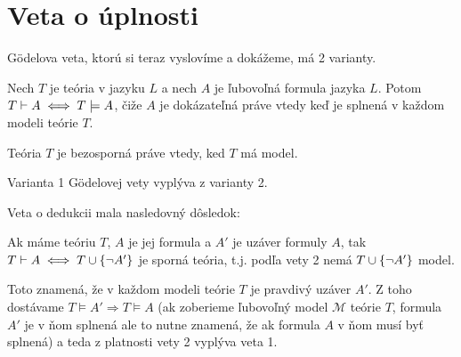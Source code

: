 \section{Veta o úplnosti}

G\"odelova veta, ktorú si teraz vyslovíme a dokážeme, má 2 varianty.

\begin{veta}[G\"odel, 1]
    Nech $T$ je teória v jazyku $L$ a nech $A$ je
    ľubovoľná formula jazyka $L$. Potom $T \vdash A \iff T \models A$,
    čiže $A$ je dokázateľná práve vtedy keď
    je splnená v každom modeli teórie $T$.
\end{veta}

\begin{veta}[G\"odel, 2]
    Teória $T$ je bezosporná práve vtedy, ked $T$ má model.
\end{veta}

\begin{poznamka}
    Varianta 1 G\"odelovej vety vyplýva z varianty 2.
\end{poznamka}

\begin{dokaz}[Poznámky]
    Veta o dedukcii mala nasledovný dôsledok:

    Ak máme teóriu $T$, $A$ je jej formula a $A'$ je uzáver formuly $A$,
    tak $T \vdash A \iff T \cup \{ \neg A' \}$ je sporná teória,
    t.j. podľa vety 2 nemá $T \cup \{ \neg A' \}$ model.

    Toto znamená, že v každom modeli teórie $T$ je pravdivý uzáver $A'$.
    Z toho dostávame $T \models A' \Rightarrow T \models A$
    (ak zoberieme ľubovoľný model $\mathcal{M}$ teórie $T$, formula
    $A'$ je v ňom splnená ale to nutne znamená, že ak formula $A$ v
    ňom musí byť splnená)
    a teda z platnosti vety 2 vyplýva veta 1.
\end{dokaz}

